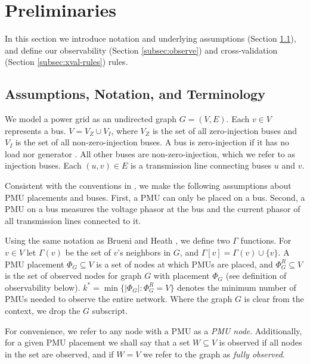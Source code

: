 \section{Preliminaries}
\label{sec:prelim}

In this section we introduce notation and underlying assumptions (Section \ref{subsec:notation-assume}), 
and define our observability (Section \ref{subsec:observe}) and cross-validation (Section \ref{subsec:xval-rules}) rules.


\subsection{Assumptions, Notation, and Terminology}
\label{subsec:notation-assume}


We model a power grid as an undirected graph $G=(V,E)$.  Each $v \in V$ represents a bus. %
$V=V_Z \cup V_I$, where $V_Z$ is the set of all zero-injection buses and $V_I$ is the set of all non-zero-injection buses.  A bus is zero-injection if it has no load nor generator \cite{Zhang10}.
All other buses are non-zero-injection, which we refer to as injection buses. Each $(u,v) \in E$ is a transmission line connecting buses $u$ and $v$. 

Consistent with the conventions in \cite{Baldwin93,Brueni05,Abur06,Mili90,Xu04,Xu05}, we make the following assumptions about PMU placements and buses. 
First, a PMU can only be placed on a bus.  Second, a PMU on a bus measures the voltage phasor at the bus and the current phasor of all transmission lines connected to it.

Using the same notation as Brueni and Heath \cite{Brueni05}, we define two $\Gamma$ functions. For $v\in V$ let $\Gamma(v)$ be the set of $v$'s neighbors in $G$, and $\Gamma[v] = \Gamma(v)\cup \{v\}$. 
A PMU placement $\Phi_G \subseteq V$ is a set of nodes at which PMUs are placed,
and $\Phi^R_G\subseteq V$ is the set of observed nodes for graph $G$ with placement $\Phi_G$ (see definition of observability below).
$k^* = \min \{|\Phi_G|:\Phi^R_G=V\}$ denotes the minimum number of PMUs needed to observe the entire network. Where the graph $G$ is clear from the context, we drop the $G$ subscript.

For convenience, we refer to any node with a PMU as a \emph{PMU node}. Additionally, for a given PMU placement we shall say that a set $W\subseteq V$ is observed if all nodes in the set are observed, and if $W=V$ we refer to the graph as \emph{fully observed}. 

